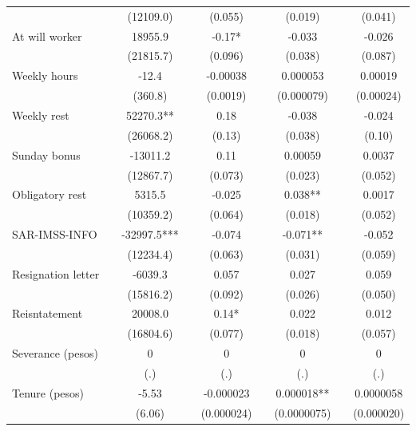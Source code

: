 \begin{tabular}{lcccccccc}
      &       & (12109.0) &       & (0.055) &       & (0.019) &       & (0.041) \\
At will worker &       & 18955.9 &       & -0.17* &       & -0.033 &       & -0.026 \\
      &       & (21815.7) &       & (0.096) &       & (0.038) &       & (0.087) \\
Weekly hours &       & -12.4 &       & -0.00038 &       & 0.000053 &       & 0.00019 \\
      &       & (360.8) &       & (0.0019) &       & (0.000079) &       & (0.00024) \\
Weekly rest &       & 52270.3** &       & 0.18  &       & -0.038 &       & -0.024 \\
      &       & (26068.2) &       & (0.13) &       & (0.038) &       & (0.10) \\
Sunday bonus &       & -13011.2 &       & 0.11  &       & 0.00059 &       & 0.0037 \\
      &       & (12867.7) &       & (0.073) &       & (0.023) &       & (0.052) \\
Obligatory rest &       & 5315.5 &       & -0.025 &       & 0.038** &       & 0.0017 \\
      &       & (10359.2) &       & (0.064) &       & (0.018) &       & (0.052) \\
SAR-IMSS-INFO &       & -32997.5*** &       & -0.074 &       & -0.071** &       & -0.052 \\
      &       & (12234.4) &       & (0.063) &       & (0.031) &       & (0.059) \\
Resignation letter &       & -6039.3 &       & 0.057 &       & 0.027 &       & 0.059 \\
      &       & (15816.2) &       & (0.092) &       & (0.026) &       & (0.050) \\
Reisntatement &       & 20008.0 &       & 0.14* &       & 0.022 &       & 0.012 \\
      &       & (16804.6) &       & (0.077) &       & (0.018) &       & (0.057) \\
Severance (pesos) &       & 0     &       & 0     &       & 0     &       & 0 \\
      &       & (.)   &       & (.)   &       & (.)   &       & (.) \\
Tenure (pesos) &       & -5.53 &       & -0.000023 &       & 0.000018** &       & 0.0000058 \\
      &       & (6.06) &       & (0.000024) &       & (0.0000075) &       & (0.000020) \\

\end{tabular}
